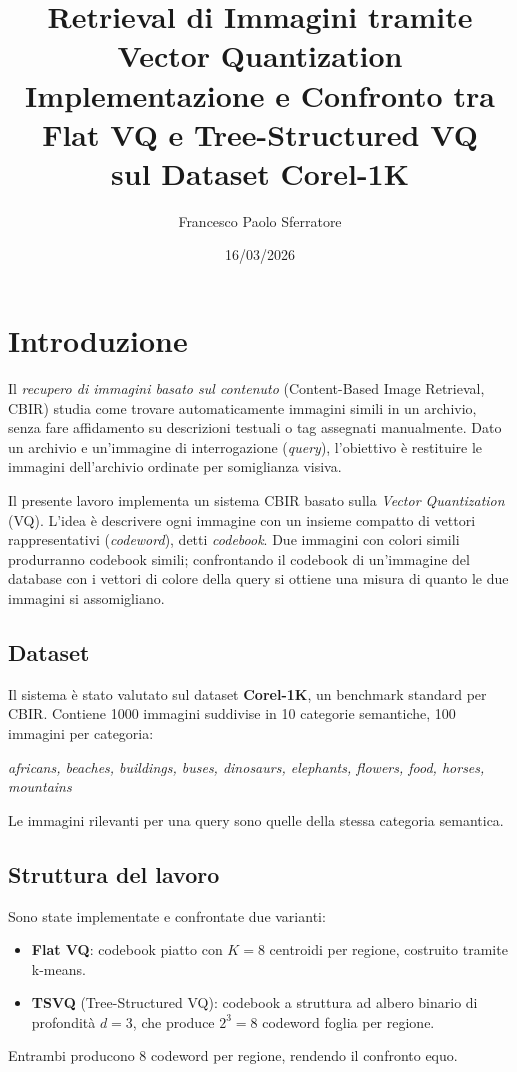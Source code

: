 \documentclass[12pt, a4paper]{article}
\title{\textbf{Retrieval di Immagini tramite Vector Quantization}\\[0.5em]
\large Implementazione e Confronto tra Flat VQ e Tree-Structured VQ\\[0.3em]
sul Dataset Corel-1K}
\author{Francesco Paolo Sferratore}
\date{16/03/2026}
\begin{document}
\maketitle
\tableofcontents
\newpage

\section{Introduzione}

Il \textit{recupero di immagini basato sul contenuto} (Content-Based Image Retrieval, CBIR)
studia come trovare automaticamente immagini simili in un archivio, senza fare affidamento
su descrizioni testuali o tag assegnati manualmente. Dato un archivio e un'immagine di
interrogazione (\textit{query}), l'obiettivo è restituire le immagini dell'archivio ordinate
per somiglianza visiva.

Il presente lavoro implementa un sistema CBIR basato sulla \textit{Vector Quantization} (VQ).
L'idea è descrivere ogni immagine con un insieme compatto di vettori rappresentativi
(\textit{codeword}), detti \textit{codebook}. Due immagini con colori simili produrranno
codebook simili; confrontando il codebook di un'immagine del database con i vettori di
colore della query si ottiene una misura di quanto le due immagini si assomigliano.

\subsection*{Dataset}
Il sistema è stato valutato sul dataset \textbf{Corel-1K}, un benchmark standard per CBIR.
Contiene 1000 immagini suddivise in 10 categorie semantiche, 100 immagini per categoria:
\begin{center}
\textit{africans, beaches, buildings, buses, dinosaurs, elephants, flowers, food, horses, mountains}
\end{center}
Le immagini rilevanti per una query sono quelle della stessa categoria semantica.

\subsection*{Struttura del lavoro}
Sono state implementate e confrontate due varianti:
\begin{itemize}
    \item \textbf{Flat VQ}: codebook piatto con $K=8$ centroidi per regione, costruito
          tramite k-means.
    \item \textbf{TSVQ} (Tree-Structured VQ): codebook a struttura ad albero binario di
          profondità $d=3$, che produce $2^3 = 8$ codeword foglia per regione.
\end{itemize}
Entrambi producono 8 codeword per regione, rendendo il confronto equo.
\end{document}
